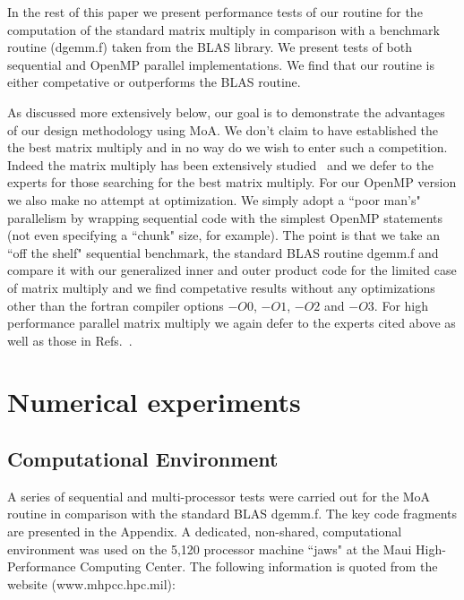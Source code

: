 \documentclass[aps,prl,twocolumn,groupedaddress,floatfix]{revtex4}
\begin{document}
In the rest of this paper we present performance tests of our routine for 
the computation of the standard matrix multiply in comparison with a benchmark 
routine (dgemm.f) taken from the BLAS library.  We present tests of both
sequential and OpenMP parallel implementations.  We find that our 
routine is either competative or outperforms the BLAS routine. 

As discussed more extensively below, our goal is to demonstrate the 
advantages of our design methodology using MoA.  We don't claim to have 
established the the best matrix multiply and in no way do we wish to 
enter such a competition.  Indeed the matrix multiply has been extensively
studied~\cite{dongarra88a,dongarra88b,dongarra90a,dongarra90b,blackford02,
whaley01,gunnels01,gunnels05,gunnels06,vandegeijn97,
low05,bientinesi05a,bientinesi05b,lawson79a,lawson79b,anderson99} and we 
defer to the experts for those searching for the best matrix multiply.  For 
our OpenMP version we also make no attempt at optimization.  We simply adopt a 
``poor man's" parallelism by wrapping sequential code with the simplest
OpenMP statements (not even specifying a ``chunk" size, for example).  The
point is that we take an ``off the shelf" sequential benchmark, the 
standard BLAS routine dgemm.f and compare it with our generalized inner
and outer product code for the limited case of matrix multiply and we find
competative results without any optimizations other than the fortran 
compiler options $-O0$, $-O1$, $-O2$ and $-O3$.  For high performance 
parallel matrix multiply we again defer to the experts cited above as well
as those in Refs.~\citep{bentz05,addison,santos03,bilmes97,demmel05,bernsten89,
choi94,lederman93a,li01,irony04}.


\section{Numerical experiments}

\subsection{Computational Environment}
A series of sequential and multi-processor tests were carried out for 
the MoA routine in comparison with the standard BLAS dgemm.f.  
The key code fragments are presented in the Appendix.
A dedicated, non-shared, computational environment was used on the 
5,120 processor machine ``jaws" at the Maui High-Performance Computing Center.  The following
information is quoted from the website (www.mhpcc.hpc.mil):
\end{document}
